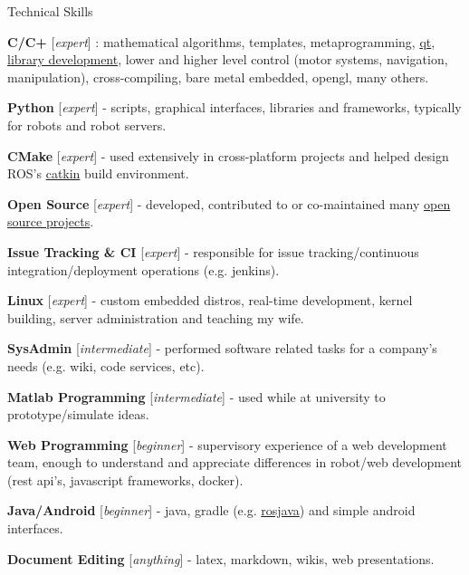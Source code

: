 \documentclass[a4paper,10pt]{article}
\begin{document}
\begin{cvsection}{Technical Skills}
 \raggedright
  \begin{djs_itemize}
    \item \textbf{C/C+} [\textit{expert}] : mathematical algorithms, templates, metaprogramming, \href{https://github.com/Itseez/opencv/pull/3194}{qt}, \href{https://github.com/stonier/ecl_core}{library development}, lower and higher level control (motor systems, navigation, manipulation), cross-compiling, bare metal embedded, opengl, many others.
    \item \textbf{Python} [\textit{expert}] - scripts, graphical interfaces, libraries and frameworks, typically for robots and robot servers.
    \item \textbf{CMake} [\textit{expert}] - used extensively in cross-platform projects and helped design ROS's \href{https://github.com/ros/catkin}{catkin} build environment.
    \item \textbf{Open Source} [\textit{expert}] - developed, contributed to or co-maintained many \href{https://github.com/stonier}{open source projects}.
    \item \textbf{Issue Tracking \& CI} [\textit{expert}] - responsible for issue tracking/continuous integration/deployment operations (e.g. jenkins).
    \item \textbf{Linux} [\textit{expert}] - custom embedded distros, real-time development, kernel building, server administration and teaching my wife.
    \item \textbf{SysAdmin} [\textit{intermediate}] - performed software related tasks for a company's needs (e.g. wiki, code services, etc).
    \item \textbf{Matlab Programming} [\textit{intermediate}] - used while at university to prototype/simulate ideas.
    \item \textbf{Web Programming} [\textit{beginner}] - supervisory experience of a web development team, enough to understand and appreciate differences in robot/web development (rest api's, javascript frameworks, docker).
    \item \textbf{Java/Android} [\textit{beginner}] - java, gradle (e.g. \href{https://github.com/rosjava}{rosjava}) and simple android interfaces.
    \item \textbf{Document Editing} [\textit{anything}] - latex, markdown, wikis, web presentations.
  \end{djs_itemize}
\end{cvsection}
\end{document}
